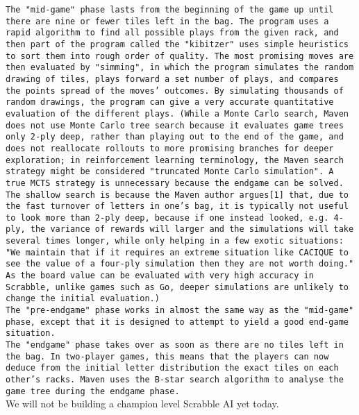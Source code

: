 \documentclass{42-en}
\begin{document}
\texttt{The "mid-game" phase lasts from the beginning of the game up until there are nine or fewer tiles left in the bag. The program uses a rapid algorithm to find all possible plays from the given rack, and then part of the program called the "kibitzer" uses simple heuristics to sort them into rough order of quality. The most promising moves are then evaluated by "simming", in which the program simulates the random drawing of tiles, plays forward a set number of plays, and compares the points spread of the moves' outcomes. By simulating thousands of random drawings, the program can give a very accurate quantitative evaluation of the different plays. (While a Monte Carlo search, Maven does not use Monte Carlo tree search because it evaluates game trees only 2-ply deep, rather than playing out to the end of the game, and does not reallocate rollouts to more promising branches for deeper exploration; in reinforcement learning terminology, the Maven search strategy might be considered "truncated Monte Carlo simulation". A true MCTS strategy is unnecessary because the endgame can be solved. The shallow search is because the Maven author argues[1] that, due to the fast turnover of letters in one's bag, it is typically not useful to look more than 2-ply deep, because if one instead looked, e.g. 4-ply, the variance of rewards will larger and the simulations will take several times longer, while only helping in a few exotic situations: "We maintain that if it requires an extreme situation like CACIQUE to see the value of a four-ply simulation then they are not worth doing." As the board value can be evaluated with very high accuracy in Scrabble, unlike games such as Go, deeper simulations are unlikely to change the initial evaluation.)}\\

\texttt{The "pre-endgame" phase works in almost the same way as the "mid-game" phase, except that it is designed to attempt to yield a good end-game situation.}\\

\texttt{The "endgame" phase takes over as soon as there are no tiles left in the bag. In two-player games, this means that the players can now deduce from the initial letter distribution the exact tiles on each other's racks. Maven uses the B-star search algorithm to analyse the game tree during the endgame phase.}\\

We will not be building a champion level Scrabble AI yet today.

\startexercices
\end{document}
